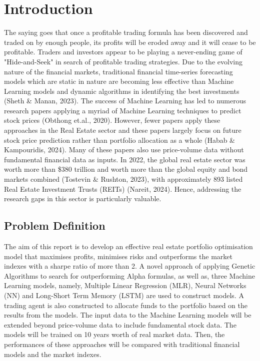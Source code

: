\documentclass[a4paper,12pt]{report}
\numberwithin{equation}{section}
\theoremstyle{definition}
\begin{document}
\chapter{Introduction}
The saying goes that once a profitable trading formula has been discovered and traded on by enough people, its profits will be eroded away and it will cease to be profitable. Traders and investors appear to be playing a never-ending game of "Hide-and-Seek" in search of profitable trading strategies. Due to the evolving nature of the financial markets, traditional financial time-series forecasting models which are static in nature are becoming less effective than Machine Learning models and dynamic algorithms in identifying the best investments (Sheth \& Manan, 2023). The success of Machine Learning has led to numerous research papers applying a myriad of Machine Learning techniques to predict stock prices (Obthong et.al., 2020). However, fewer papers apply these approaches in the Real Estate sector and these papers largely focus on future stock price prediction rather than portfolio allocation as a whole (Habab \& Kampouridis, 2024). Many of these papers also use price-volume data without fundamental financial data as inputs. In 2022, the global real estate sector was worth more than \$380 trillion and worth more than the global equity and bond markets combined (Tostevin \& Rushton, 2023), with approximately 893 listed Real Estate Investment Trusts (REITs) (Nareit, 2024). Hence, addressing the research gaps in this sector is particularly valuable.


\section{Problem Definition}
The aim of this report is to develop an effective real estate portfolio optimisation model that maximises profits, minimises risks and outperforms the market indexes with a sharpe ratio of more than 2. A novel approach of applying Genetic Algorithms to search for outperforming Alpha formulas, as well as, three Machine Learning models, namely, Multiple Linear Regression (MLR), Neural Networks (NN) and Long-Short Term Memory (LSTM) are used to construct models. A trading agent is also constructed to allocate funds to the portfolio based on the results from the models. The input data to the Machine Learning models will be extended beyond price-volume data to include fundamental stock data. The models will be trained on 10 years worth of real market data. Then, the performances of these approaches will be compared with traditional financial models and the market indexes.
\end{document}
